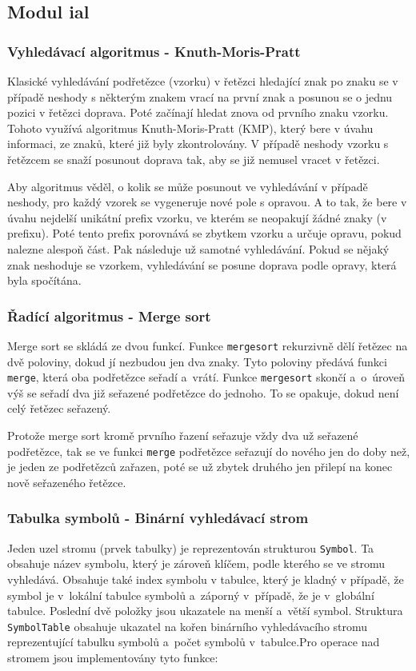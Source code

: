 \documentclass[12pt,a4paper,titlepage,final]{article}
\begin{document}
\subsection{Modul ial}
\subsubsection{Vyhledávací algoritmus - Knuth-Moris-Pratt}
Klasické vyhledávání podřetězce (vzorku) v řetězci hledající znak po znaku se 
v případě neshody s některým znakem vrací na první znak a posunou se o jednu 
pozici v řetězci doprava. Poté začínají hledat znova od prvního znaku vzorku. 
Tohoto využívá algoritmus Knuth-Moris-Pratt (KMP), který bere v úvahu informaci, 
ze znaků, které již byly zkontrolovány. V případě neshody vzorku s řetězcem se 
snaží posunout doprava tak, aby se již nemusel vracet v řetězci. 

Aby algoritmus věděl, o kolik se může posunout ve vyhledávání v případě neshody, 
pro každý vzorek se vygeneruje nové pole s opravou. A to tak, že bere v úvahu 
nejdelší unikátní prefix vzorku, ve kterém se neopakují žádné znaky (v prefixu). 
Poté tento prefix porovnává se zbytkem vzorku a určuje opravu, pokud nalezne alespoň část. 
Pak následuje už samotné vyhledávání. Pokud se nějaký znak neshoduje se vzorkem, 
vyhledávání se posune doprava podle opravy, která byla spočítána. 

\subsubsection{Řadící algoritmus - Merge sort}
Merge sort se skládá ze dvou funkcí. Funkce \texttt{mergesort} rekurzivně dělí 
řetězec na dvě poloviny, dokud jí nezbudou jen dva znaky. Tyto poloviny předává funkci
\texttt{merge}, která oba podřetězce seřadí a~vrátí. Funkce \texttt{mergesort} skončí 
a~o~úroveň výš se seřadí dva již seřazené podřetězce do jednoho. To se opakuje, dokud 
není celý řetězec seřazený.

Protože merge sort kromě prvního řazení seřazuje vždy dva už seřazené podřetězce, 
tak se ve funkci \texttt{merge} podřetězce seřazují do nového jen do doby než, 
je jeden ze podřetězců zařazen, poté se už zbytek druhého jen přilepí na konec nově 
seřazeného řetězce.  

\subsubsection{Tabulka symbolů - Binární vyhledávací strom}
Jeden uzel stromu (prvek tabulky) je reprezentován strukturou \texttt{Symbol}.
Ta obsahuje název symbolu, který je zároveň klíčem, podle kterého se ve stromu vyhledává. 
Obsahuje také index symbolu v tabulce, který je kladný v případě, že symbol je 
v~lokální tabulce symbolů a~záporný v~případě, že je v~globální tabulce. Poslední dvě 
položky jsou ukazatele na menší a~větší symbol. Struktura \texttt{SymbolTable} obsahuje 
ukazatel na kořen binárního vyhledávacího stromu reprezentující tabulku symbolů a~počet 
symbolů v~tabulce.\newline\newline Pro operace nad stromem jsou implementovány tyto funkce:
\medskip
\end{document}
